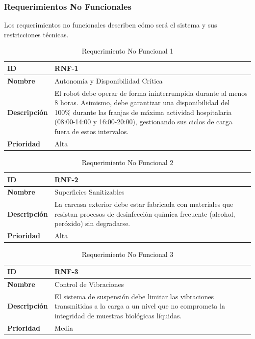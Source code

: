 \newpage
\subsubsection{Requerimientos No Funcionales}
Los requerimientos no funcionales describen cómo será el sistema y sus restricciones técnicas.

\begin{table}[H]
\centering
\begin{tabular}{|l|p{10cm}|}
\hline
\textbf{ID} & RNF-1 \\ \hline
\textbf{Nombre} & Autonomía y Disponibilidad Crítica \\ \hline
\textbf{Descripción} & El robot debe operar de forma ininterrumpida durante al menos 8 horas. Asimismo, debe garantizar una disponibilidad del 100\% durante las franjas de máxima actividad hospitalaria (08:00-14:00 y 16:00-20:00), gestionando sus ciclos de carga fuera de estos intervalos. \\ \hline
\textbf{Prioridad} & Alta \\ \hline
\end{tabular}
\caption{Requerimiento No Funcional 1}
\end{table}

\begin{table}[H]
\centering
\begin{tabular}{|l|p{10cm}|}
\hline
\textbf{ID} & RNF-2 \\ \hline
\textbf{Nombre} & Superficies Sanitizables \\ \hline
\textbf{Descripción} & La carcasa exterior debe estar fabricada con materiales que resistan procesos de desinfección química frecuente (alcohol, peróxido) sin degradarse. \\ \hline
\textbf{Prioridad} & Alta \\ \hline
\end{tabular}
\caption{Requerimiento No Funcional 2}
\end{table}

\begin{table}[H]
\centering
\begin{tabular}{|l|p{10cm}|}
\hline
\textbf{ID} & RNF-3 \\ \hline
\textbf{Nombre} & Control de Vibraciones \\ \hline
\textbf{Descripción} & El sistema de suspensión debe limitar las vibraciones transmitidas a la carga a un nivel que no comprometa la integridad de muestras biológicas líquidas. \\ \hline
\textbf{Prioridad} & Media \\ \hline
\end{tabular}
\caption{Requerimiento No Funcional 3}
\end{table}

